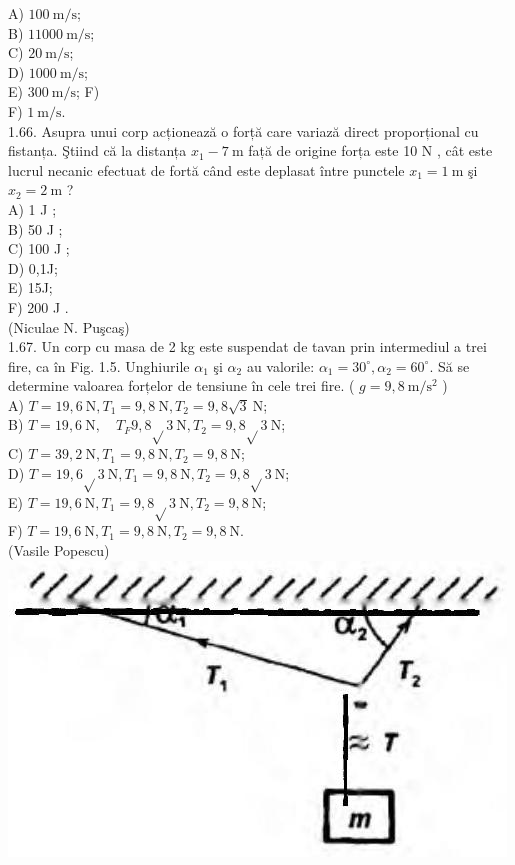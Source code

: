 \documentclass[10pt]{article}
\begin{document}
A) $100 \mathrm{~m} / \mathrm{s}$;\\
B) $11000 \mathrm{~m} / \mathrm{s}$;\\
C) $20 \mathrm{~m} / \mathrm{s}$;\\
D) $1000 \mathrm{~m} / \mathrm{s}$;\\
E) $300 \mathrm{~m} / \mathrm{s}$; F)\\
F) $1 \mathrm{~m} / \mathrm{s}$.\\
1.66. Asupra unui corp acționează o forță care variază direct proporțional cu fistanța. Ştiind că la distanța $x_{1}-7 \mathrm{~m}$ față de origine forța este 10 N , cât este lucrul necanic efectuat de fortă când este deplasat între punctele $x_{1}=1 \mathrm{~m}$ şi $x_{2}=2 \mathrm{~m}$ ?\\
A) 1 J ;\\
B) 50 J ;\\
C) 100 J ;\\
D) 0,1J;\\
E) 15J;\\
F) 200 J .\\
(Niculae N. Puşcaş)\\
1.67. Un corp cu masa de 2 kg este suspendat de tavan prin intermediul a trei fire, ca în Fig. 1.5. Unghiurile $\alpha_{1}$ şi $\alpha_{2}$ au valorile: $\alpha_{1}=30^{\circ}, \alpha_{2}=60^{\circ}$. Să se determine valoarea forțelor de tensiune în cele trei fire. ( $g=9,8 \mathrm{~m} / \mathrm{s}^{2}$ )\\
A) $T=19,6 \mathrm{~N}, T_{1}=9,8 \mathrm{~N}, T_{2}=9,8 \sqrt{3} \mathrm{~N}$;\\
B) $T=19,6 \mathrm{~N}, \quad T_{F} 9,8 \sqrt{ } 3 \mathrm{~N}, T_{2}=9,8 \sqrt{ } 3 \mathrm{~N}$;\\
C) $T=39,2 \mathrm{~N}, T_{1}=9,8 \mathrm{~N}, T_{2}=9,8 \mathrm{~N}$;\\
D) $T=19,6 \sqrt{ } 3 \mathrm{~N}, T_{1}=9,8 \mathrm{~N}, T_{2}=9,8 \sqrt{ } 3 \mathrm{~N}$;\\
E) $T=19,6 \mathrm{~N}, T_{1}=9,8 \sqrt{ } 3 \mathrm{~N}, T_{2}=9,8 \mathrm{~N}$;\\
F) $T=19,6 \mathrm{~N}, T_{1}=9,8 \mathrm{~N}, T_{2}=9,8 \mathrm{~N}$.\\
(Vasile Popescu)\\
\includegraphics[max width=\textwidth, center]{2025_07_01_5b3ff9fa0d508c8e9f17g-017(1)}
\end{document}
